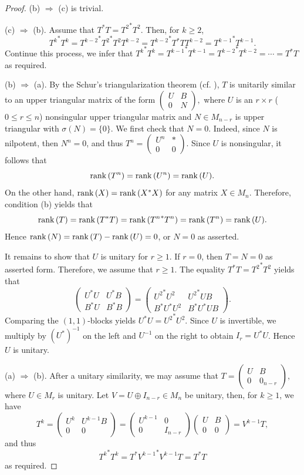 \documentclass[11pt]{article}
\numberwithin{equation}{section}
\def\rank{{\rm rank\,}}
\begin{document}
\begin{proof}
(b) $\Rightarrow$ (c) is trivial.

(c) $\Rightarrow$ (b). Assume that $T^*T={T^2}^*T^2$. Then, for $k\ge 2$,
$${T^k}^*T^k= {T^{k-2}}^*{T^2}^*T^2T^{k-2}={T^{k-2}}^*T^*TT^{k-2}={T^{k-1}}^*T^{k-1}.$$
Continue this process, we infer that ${T^k}^* T^k={T^{k-1}}^*T^{k-1}={T^{k-2}}^*T^{k-2}= \cdots =T^*T$ as required.

(b) $\Rightarrow$ (a). By the Schur’s triangularization theorem (cf. \cite[Theorem 2.3.1]{HJ}), $T$ is unitarily similar to an upper triangular matrix of the form
$
\begin{pmatrix}
U & B\\
0 & N
\end{pmatrix},
$
where $U$ is an $r \times r$ ($0\le r\le n$) nonsingular upper triangular matrix and $N\in M_{n-r}$ is upper triangular with $\sigma(N)=\{0\}$. We first check that $N=0$. Indeed, since $N$ is nilpotent, then $N^n=0$, and thus
$T^n=
\begin{pmatrix}
U^n & *\\
0 & 0
\end{pmatrix}$. Since $U$ is nonsingular, it follows that
$$
\rank(T^n)=\rank(U^n)=\rank(U).
$$
On the other hand, $\rank(X)=\rank (X^*X)$ for any matrix $X\in M_n$. Therefore, condition (b) yields that
$$\rank(T)=\rank(T^*T)=\rank({T^n}^* T^n)=\rank(T^n)=\rank (U).$$
Hence $\rank(N)=\rank(T)-\rank(U)=0$, or $N=0$ as asserted.

It remains to show that $U$ is unitary for $r\ge 1$. If $r=0$, then $T=N=0$ as asserted form. Therefore, we assume that $r\ge 1$. The equality $T^*T={T^2}^* T^2$ yields that
\[
\begin{pmatrix}
U^*U & U^*B\\
B^*U & B^*B
\end{pmatrix}
=
\begin{pmatrix}
{U^2}^*U^2 & {U^2}^*UB\\
B^*U^*U^2 & B^*U^*UB
\end{pmatrix}.
\]
Comparing the $(1,1)$-blocks yields
$U^*U = {U^2}^*U^2$.
Since $U$ is invertible, we multiply by $(U^*)^{-1}$ on the left and $U^{-1}$ on the right to obtain $I_r = U^*U$.
Hence $U$ is unitary.

(a) $\Rightarrow$ (b). After a unitary similarity, we may assume that
$
T=\begin{pmatrix}
U & B\\
0 & 0_{n-r}
\end{pmatrix},
$
where $U\in M_r$ is unitary.  Let $V=U\oplus I_{n-r}\in M_n$ be unitary, then, for $k\ge 1$, we have
$$T^k=\begin{pmatrix}
U^k & U^{k-1}B \\
0 & 0
\end{pmatrix}=\begin{pmatrix}
U^{k-1} & 0 \\
0 & I_{n-r}
\end{pmatrix}\begin{pmatrix}
U & B \\
0 & 0
\end{pmatrix}=V^{k-1}T,$$
and thus
$${T^k}^*T^k=T^*{V^{k-1}}^*V^{k-1}T=T^*T$$
as required.


\end{proof}
\end{document}
